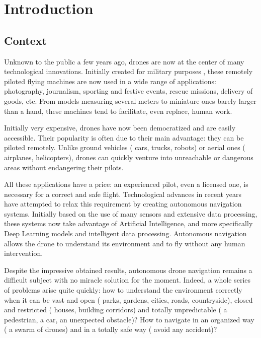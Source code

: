 \chapter{Introduction}

\setcounter{page}{1}

\section{Context}

Unknown to the public a few years ago, drones are now at the center of many technological innovations. Initially created for military purposes \cite{wikipedia2021uav, interestingengineering2021uav}, these remotely piloted flying machines are now used in a wide range of applications: photography, journalism, sporting and festive events, rescue missions, delivery of goods, etc. From models measuring several meters to miniature ones barely larger than a hand, these machines tend to facilitate, even replace, human work.

Initially very expensive, drones have now been democratized and are easily accessible. Their popularity is often due to their main advantage: they can be piloted remotely. Unlike ground vehicles (\eg{} cars, trucks, robots) or aerial ones (\eg{} airplanes, helicopters), drones can quickly venture into unreachable or dangerous areas without endangering their pilots.

All these applications have a price: an experienced pilot, even a licensed one, is necessary for a correct and safe flight. Technological advances in recent years have attempted to relax this requirement by creating autonomous navigation systems. Initially based on the use of many sensors and extensive data processing, these systems now take advantage of Artificial Intelligence, and more specifically Deep Learning models and intelligent data processing. Autonomous navigation allows the drone to understand its environment and to fly without any human intervention.

Despite the impressive obtained results, autonomous drone navigation remains a difficult subject with no miracle solution for the moment. Indeed, a whole series of problems arise quite quickly: how to understand the environment correctly when it can be vast and open (\eg{} parks, gardens, cities, roads, countryside), closed and restricted (\eg{} houses, building corridors) and totally unpredictable (\eg{} a pedestrian, a car, an unexpected obstacle)? How to navigate in an organized way (\eg{} a swarm of drones) and in a totally safe way (\eg{} avoid any accident)?

